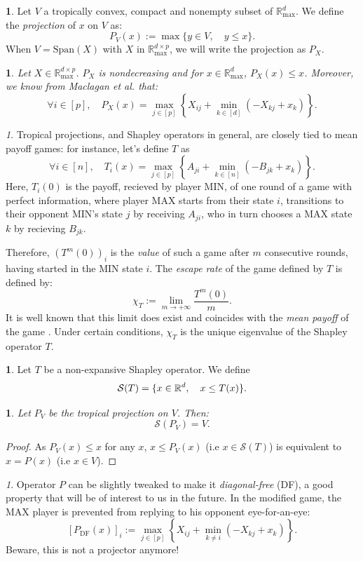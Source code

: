 \documentclass[oneside,english]{amsart}
\numberwithin{equation}{section}
\numberwithin{figure}{section}
\theoremstyle{plain}
\theoremstyle{definition}
\newtheorem{defn}[thm]{\protect\definitionname}
\theoremstyle{plain}
\newtheorem{prop}[thm]{\protect\propositionname}
\theoremstyle{remark}
\newtheorem{rem}[thm]{\protect\remarkname}
\theoremstyle{plain}
\theoremstyle{definition}
\theoremstyle{definition}
\providecommand{\definitionname}{Definition}
\providecommand{\propositionname}{Proposition}
\providecommand{\remarkname}{Remark}
\begin{document}
\begin{defn}
Let $V$ a tropically convex, compact and nonempty subset of $\mathbb{R}_{\max}^{d}$.
We define the \emph{projection} of $x$ on $V$ as: 
\[
P_{V}(x):=\max\{y\in V,\quad y\le x\}.
\]
When $V=\text{Span}(X)$ with $X$ in $\mathbb{R}_{\max}^{d\times p}$,
we will write the projection as $P_{X}$.
\end{defn}

\begin{prop}
\label{prop:(Nondecreasing)}Let $X\in\mathbb{R}_{\max}^{d\times p}$.
$P_{X}$ is nondecreasing and for $x\in\mathbb{R}_{\text{max}}^{d}$,
$P_{X}(x)\le x$. Moreover, we know from Maclagan et al. \cite{Maclagan2015}
that:
\[
\forall i\in[p],\quad P_{X}(x)=\max_{j\in[p]}\left\{ X_{ij}+\min_{k\in[d]}(-X_{kj}+x_{k})\right\} .
\]
\end{prop}

\begin{rem}
Tropical projections, and Shapley operators in general, are closely
tied to mean payoff games: for instance, let's define $T$ as
\[
\forall i\in[n],\quad T_{i}(x)=\max_{j\in[p]}\left\{ A_{ji}+\min_{k\in[n]}(-B_{jk}+x_{k})\right\} .
\]
Here, $T_{i}(0)$ is the payoff, recieved by player MIN,
of one round of a game with perfect information, where player
MAX starts from their state $i$, transitions to their opponent MIN's
state $j$ by receiving $A_{ji}$, who in turn chooses a MAX state
$k$ by recieving $B_{jk}$.

Therefore, $(T^{m}(0))_{i}$ is the \emph{value} of such a game after
$m$ consecutive rounds, having started in the MIN state $i$. The\emph{
escape rate }of the game defined by $T$ is defined by: 
\[
\chi_{T}:=\lim_{m\rightarrow+\infty}\frac{T^{m}(0)}{m}.
\]
It is well known that this limit does exist and coincides with the
\emph{mean payoff} of the game \cite{Allamigeon2018}. Under certain
conditions, $\chi_{T}$ is the unique eigenvalue of the Shapley operator
$T$. 
\end{rem}

\begin{defn}
Let $T$ be a non-expansive Shapley operator. We define
\[
\text{\ensuremath{\mathcal{S}(T)}}=\{x\in\mathbb{R}^{d},\quad x\le T(x)\}.
\]
\end{defn}

\begin{prop}
Let $P_{V}$ be the tropical projection on $V$. Then:
\[
\ensuremath{\mathcal{S}(P_{V})=V}.
\]
\end{prop}

\begin{proof}
As $P_{V}(x)\le x$ for any $x$, $x\le P_{V}(x)$ (i.e $x\in\mathcal{S}(T)$)
is equivalent to $x=P(x)$ (i.e $x\in V$).
\end{proof}
\begin{rem}
Operator $P$ can be slightly tweaked to make it \emph{diagonal-free}
(DF), a good property that will be of interest to us in the future.
In the modified game, the MAX player is prevented from replying to
his opponent eye-for-an-eye:
\[
\left[P_{\text{DF}}(x)\right]_{i}:=\max_{j\in[p]}\left\{ X_{ij}+\min_{k\ne i}(-X_{kj}+x_{k})\right\} .
\]
Beware, this is not a projector anymore!
\end{rem}
\end{document}
